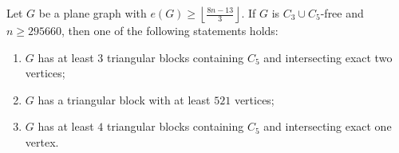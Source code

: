 \documentclass[10pt,a4paper]{amsart}
\begin{document}
\begin{lemma}\label{lemma1}
    Let $G$ be a plane graph with $e(G)\geq \left\lfloor\frac{8n-13}{3}\right\rfloor$. If $G$ is $C_3\cup C_5$-free and $n\geq 295660$, then one of the following statements holds:
    \begin{enumerate}
        
        \item[(1)] $G$ has at least $3$ triangular blocks containing $C_5$ and intersecting exact two vertices;
        
        \item[(2)] $G$ has a triangular block with at least $521$ vertices;
        
        \item[(3)] $G$ has at least $4$ triangular blocks containing $C_5$ and intersecting exact one vertex.
    
    \end{enumerate}
\end{lemma}
\end{document}
